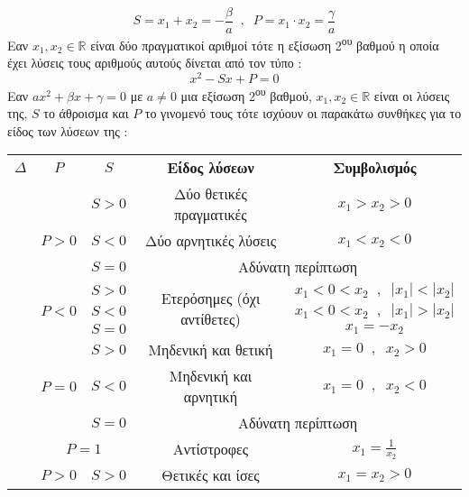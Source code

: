 \documentclass[twoside,nofonts,internet,shmeiwseis]{thewria}
\begin{document}
\begin{enumerate}
\begin{center}
\begin{tabular}{ccc}
\hline 
\end{tabular}
\end{center}
\[ S=x_1+x_2=-\dfrac{\beta}{a}\;\;,\;\;P=x_1\cdot x_2=\dfrac{\gamma}{a} \]
Εαν $ x_1,x_2\in\mathbb{R} $ είναι δύο πραγματικοί αριθμοί τότε η εξίσωση 2\textsuperscript{ου} βαθμού η οποία έχει λύσεις τους αριθμούς αυτούς δίνεται από τον τύπο : \[ x^2-Sx+P=0 \]	
Εαν $ ax^2+\beta x+\gamma=0 $ με $ a\neq0 $ μια εξίσωση 2\textsuperscript{ου} βαθμού, $ x_1,x_2\in\mathbb{R} $ είναι οι λύσεις της, $ S $  το άθροισμα και $ P $ το γινομενό τους τότε ισχύουν οι παρακάτω συνθήκες για το είδος των λύσεων της :
\begin{center}
\begin{longtable}{c|c|c|cc}
\hline \rule[-2ex]{0pt}{5.5ex} \boldmath$\varDelta$ & \boldmath$P$ & \boldmath$S$ & \textbf{Είδος λύσεων} & \textbf{Συμβολισμός}\\ 
\hhline{=====} \rule[-2ex]{0pt}{5.5ex}  &  & $ S>0 $ & Δύο θετικές πραγματικές & $ x_1>x_2>0 $ \\ 
\hhline{~|~-~~} \multirow{15}{*}{$ \varDelta>0 $}  & $ P>0 $ & $ S<0 $ & Δύο αρνητικές λύσεις & $ x_1<x_2<0 $ \rule[-2ex]{0pt}{5.5ex}\\ 
\hhline{~|~-~~}   &  & $ S=0 $ & \multicolumn{2}{c}{Αδύνατη περίπτωση}  \rule[-2ex]{0pt}{5.5ex}\\ 
\hhline{~|----}   &  & $ S>0 $ & \multirow{3}{*}{Ετερόσημες (όχι αντίθετες)} & $ x_1<0<x_2\;\;,\;\;|x_1|<|x_2| $ \rule[-2ex]{0pt}{5.5ex}\\ 
\hhline{~|~-~~} \rule[-2ex]{0pt}{5.5ex}  & $ P<0 $ & $ S<0 $ &  & $ x_1<0<x_2\;\;,\;\;|x_1|>|x_2| $ \\ 
\hhline{~|~-~~} \rule[-2ex]{0pt}{5.5ex}  &  & $ S=0 $ & Αντίθετες  & $ x_1=-x_2 $ \\ 
\hhline{~|----} \rule[-2ex]{0pt}{5.5ex}  &  & $ S>0 $ & Μηδενική και θετική & $ x_1=0\;\;,\;\;x_2>0 $ \\ 
\hhline{~|~-~~} \rule[-2ex]{0pt}{5.5ex}  & $ P=0 $ & $ S<0 $ & Μηδενική και αρνητική & $ x_1=0\;\;,\;\;x_2<0 $ \\ 
\hhline{~|~-~~} \rule[-2ex]{0pt}{5.5ex}  &  & $ S=0 $ &  \multicolumn{2}{c}{Αδύνατη περίπτωση}  \\ 
\hhline{~|----} \rule[-2ex]{0pt}{5.5ex}  & \multicolumn{2}{c|}{$ P=1 $} & Αντίστροφες & $ x_1=\frac{1}{x_2} $  \\ 
\hhline{-----}   & \multirow{3}{*}{$ P>0 $} & $ S>0 $ & Θετικές και ίσες  & $ x_1=x_2>0 $ \rule[-2ex]{0pt}{5.5ex}\\ 

\end{longtable}
\end{center}
\end{enumerate}
\end{document}
